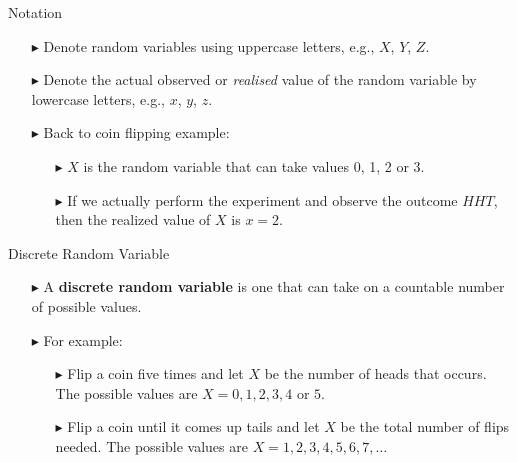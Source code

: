 \documentclass[12pt]{beamer}
\begin{document}
\begin{frame}{Notation}
	
	\begin{itemize}
		\item[\color{blue}$\blacktriangleright$] Denote random variables using uppercase letters, e.g., $X$, $Y$, $Z$.
		
		\item[\color{blue}$\blacktriangleright$] Denote the actual observed or \textit{realised} value of the random variable by lowercase letters, e.g., $x$, $y$, $z$.
		
		\item[\color{blue}$\blacktriangleright$] Back to coin flipping example:
		\begin{itemize}
			\item[\color{blue}$\blacktriangleright$] $X$ is the random variable that can take values 0, 1, 2 or 3.
			\item[\color{blue}$\blacktriangleright$] If we actually perform the experiment and observe the outcome $HHT$, then the realized value of $X$ is $x = 2$.
		\end{itemize}
	\end{itemize}
	
\end{frame}

\begin{frame}{Discrete Random Variable}
	
	\begin{itemize}
		\item[\color{blue}$\blacktriangleright$] A \textbf{discrete random variable} is one that can take on a countable number of possible values.
		
		\item[\color{blue}$\blacktriangleright$] For example:
		\begin{itemize}
			\item[\color{blue}$\blacktriangleright$] Flip a coin five times and let $X$ be the number of heads that occurs. The possible values are 
			$X = 0, 1, 2, 3, 4$ or $5$.
			
			\item[\color{blue}$\blacktriangleright$] Flip a coin until it comes up tails and let $X$ be the total number of flips needed. The possible values are
			$X = 1, 2, 3, 4, 5, 6, 7, \ldots$
		\end{itemize}
	\end{itemize}
	
\end{frame}
\end{document}
